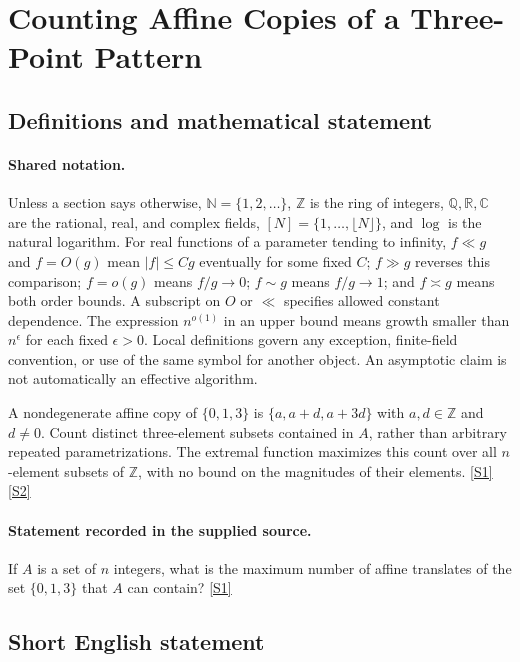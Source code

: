 \documentclass[11pt,a4paper]{article}
\newcommand{\N}{\mathbb{N}}
\newcommand{\Z}{\mathbb{Z}}
\newcommand{\Q}{\mathbb{Q}}
\newcommand{\R}{\mathbb{R}}
\newcommand{\C}{\mathbb{C}}
\newcommand{\sref}[2]{\hyperlink{source:#1:#2}{[S#2]}}
\begin{document}
\section{Counting Affine Copies of a Three-Point Pattern}\label{statement}


\subsection{Definitions and mathematical statement}

\paragraph{Shared notation.}Unless a section says otherwise, $\N=\{1,2,\ldots\}$,
$\Z$ is the ring of integers, $\Q,\R,\C$ are the rational, real, and complex
fields, $[N]=\{1,\ldots,\lfloor N\rfloor\}$, and $\log$ is the natural
logarithm. For real functions of a parameter tending to infinity,
$f\ll g$ and $f=O(g)$ mean $|f|\leq Cg$ eventually for some fixed $C$;
$f\gg g$ reverses this comparison; $f=o(g)$ means $f/g\to0$;
$f\sim g$ means $f/g\to1$; and $f\asymp g$ means both order bounds.
A subscript on $O$ or $\ll$ specifies allowed constant dependence.
The expression $n^{o(1)}$ in an upper bound means growth smaller than
$n^\epsilon$ for each fixed $\epsilon>0$. Local definitions govern any
exception, finite-field convention, or use of the same symbol for another
object. An asymptotic claim is not automatically an effective algorithm.



A nondegenerate affine copy of $\{0,1,3\}$ is $\{a,a+d,a+3d\}$ with $a,d\in\Z$ and $d\ne0$. Count distinct three-element subsets contained in $A$, rather than arbitrary repeated parametrizations. The extremal function maximizes this count over all $n$-element subsets of $\Z$, with no bound on the magnitudes of their elements. \sref{statement}{1} \sref{statement}{2}

\paragraph{Statement recorded in the supplied source.}
If $A$ is a set of $n$ integers, what is the maximum number of affine translates of the set $\{0, 1, 3\}$ that $A$ can contain? \sref{statement}{1}

\subsection{Short English statement}
\end{document}
